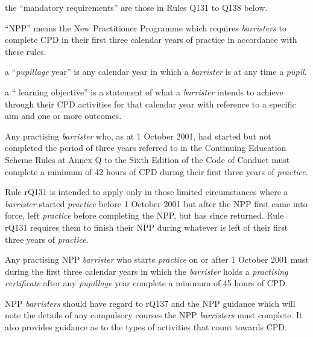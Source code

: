 \item the ``mandatory requirements'' are those in Rules Q131 to Q138 below.

\item ``NPP'' means the New Practitioner Programme which requires
\emph{barristers} to complete CPD in their first three calendar years of
practice in accordance with these rules.

\item a ``\emph{pupillage} year'' is any calendar year in which a
\emph{barrister} is at any time a \emph{pupil}.

\item a `` learning objective'' is a statement of what a \emph{barrister}
intends to achieve through their CPD activities for that calendar year
with reference to a specific aim and one or more outcomes.
\ln
{}

Any practising \emph{barrister} who, as at 1 October 2001, had started
but not completed the period of three years referred to in the
Continuing Education Scheme Rules at Annex Q to the Sixth Edition of the
Code of Conduct must complete a minimum of 42 hours of CPD during their
first three years of \emph{practice}.





Rule rQ131 is intended to apply only in those limited circumstances
where a \emph{barrister} started \emph{practice} before 1 October 2001
but after the NPP first came into force, left \emph{practice} before
completing the NPP, but has since returned. Rule rQ131 requires them to
finish their NPP during whatever is left of their first three years of
\emph{practice}.




Any practising NPP \emph{barrister} who starts \emph{practice} on or
after 1 October 2001 must during the first three calendar years in which
the \emph{barrister} holds a \emph{practising certificate} after any
\emph{pupillage} year complete a minimum of 45 hours of CPD.





NPP \emph{barristers} should have regard to rQ137 and the NPP guidance
which will note the details of any compulsory courses the NPP
\emph{barristers} must complete. It also provides guidance as to the
types of activities that count towards CPD.


